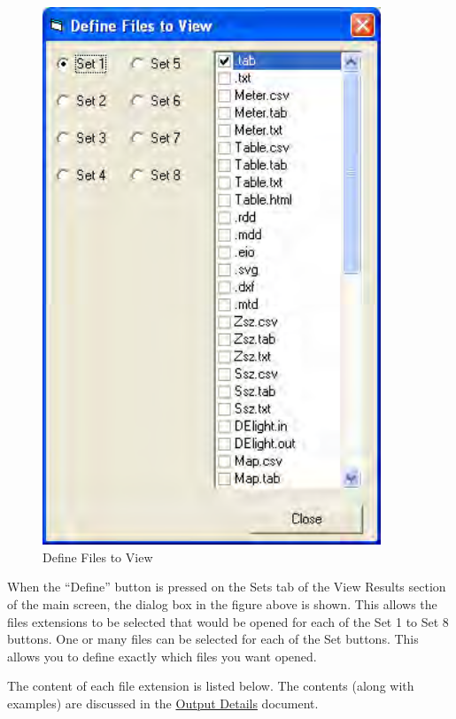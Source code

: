 \begin{figure}[hbtp] %
\centering
\includegraphics[width=0.9\textwidth, height=0.9\textheight, keepaspectratio=true]{media/image104.png}
\caption{Define Files to View \protect \label{fig:define-files-to-view}}
\end{figure}

When the ``Define'' button is pressed on the Sets tab of the View Results section of the main screen, the dialog box in the figure above is shown. This allows the files extensions to be selected that would be opened for each of the Set 1 to Set 8 buttons. One or many files can be selected for each of the Set buttons. This allows you to define exactly which files you want opened.

The content of each file extension is listed below. The contents (along with examples) are discussed in the \href{file:///E:/Docs4PDFs/OutputDetailsAndExamples.pdf}{Output Details} document.

